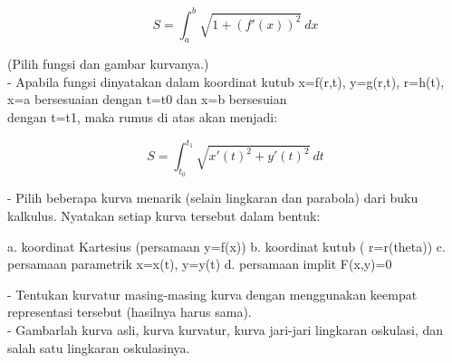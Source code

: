\documentclass[a4paper,10pt]{article}
\begin{document}
\begin{eulernotebook}
\begin{eulercomment}
\begin{eulercomment}
\begin{eulercomment}
\begin{eulercomment}
\begin{eulercomment}
\begin{eulercomment}
\begin{eulercomment}
\begin{eulercomment}
\begin{eulercomment}
\begin{eulercomment}
\begin{eulercomment}
\begin{eulercomment}
\begin{eulercomment}
\begin{eulercomment}
\begin{eulercomment}
\begin{eulercomment}
\begin{eulercomment}
\begin{eulercomment}
\begin{eulercomment}
\begin{eulercomment}
\begin{eulercomment}
\begin{eulercomment}
\begin{eulercomment}
\begin{eulercomment}
\begin{eulercomment}
\end{eulercomment}
\begin{eulerformula}
\[
S = \int_a^b \sqrt{1+(f'(x))^2} \ dx
\]
\end{eulerformula}
\begin{eulercomment}
(Pilih fungsi dan gambar kurvanya.)\\
- Apabila fungsi dinyatakan dalam koordinat kutub x=f(r,t), y=g(r,t),
r=h(t), x=a bersesuaian dengan t=t0 dan x=b bersesuian\\
dengan t=t1, maka rumus di atas akan menjadi:

\end{eulercomment}
\begin{eulerformula}
\[
S=\int_{t_0}^{t_1} \sqrt{x'(t)^2+y'(t)^2}\ dt
\]
\end{eulerformula}
\begin{eulercomment}
- Pilih beberapa kurva menarik (selain lingkaran dan parabola) dari
buku  kalkulus. Nyatakan setiap kurva tersebut dalam bentuk:

\end{eulercomment}
\begin{eulerttcomment}
  a. koordinat Kartesius (persamaan y=f(x))
  b. koordinat kutub ( r=r(theta))
  c. persamaan parametrik x=x(t), y=y(t)
  d. persamaan implit F(x,y)=0
\end{eulerttcomment}
\begin{eulercomment}

- Tentukan kurvatur masing-masing kurva dengan menggunakan keempat
representasi tersebut (hasilnya harus sama).\\
- Gambarlah kurva asli, kurva kurvatur, kurva jari-jari lingkaran
oskulasi, dan salah satu lingkaran oskulasinya.



\end{eulercomment}
\end{eulercomment}
\end{eulercomment}
\end{eulercomment}
\end{eulercomment}
\end{eulercomment}
\end{eulercomment}
\end{eulercomment}
\end{eulercomment}
\end{eulercomment}
\end{eulercomment}
\end{eulercomment}
\end{eulercomment}
\end{eulercomment}
\end{eulercomment}
\end{eulercomment}
\end{eulercomment}
\end{eulercomment}
\end{eulercomment}
\end{eulercomment}
\end{eulercomment}
\end{eulercomment}
\end{eulercomment}
\end{eulercomment}
\end{eulercomment}
\end{eulernotebook}
\end{document}
